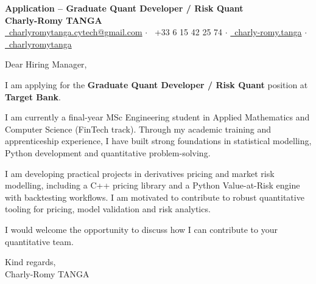 \documentclass[10pt, letterpaper]{article}
\newcommand{\targetCompany}{Target Bank}
\newcommand{\targetRole}{Graduate Quant Developer / Risk Quant}
\begin{document}
\begin{center}
    \textbf{\LARGE Application -- \targetRole{}} \\[0.2cm]
    \textbf{\large Charly-Romy TANGA} \\[0.2cm]
    \href{mailto:charlyromytanga.cytech@gmail.com}{\faEnvelope\ charlyromytanga.cytech@gmail.com}
    \quad$\cdot$\quad
    \faPhone\ +33 6 15 42 25 74
    \quad$\cdot$\quad
    \href{https://www.linkedin.com/in/charly-romy-tanga}{\faLinkedin\ charly-romy.tanga}
    \quad$\cdot$\quad
    \href{https://github.com/charlyromytanga}{\faGithub\ charlyromytanga}
\end{center}

Dear Hiring Manager,

I am applying for the \textbf{\targetRole{}} position at \textbf{\targetCompany{}}.

I am currently a final-year MSc Engineering student in Applied Mathematics and Computer Science (FinTech track). Through my academic training and apprenticeship experience, I have built strong foundations in statistical modelling, Python development and quantitative problem-solving.

I am developing practical projects in derivatives pricing and market risk modelling, including a C++ pricing library and a Python Value-at-Risk engine with backtesting workflows. I am motivated to contribute to robust quantitative tooling for pricing, model validation and risk analytics.

I would welcome the opportunity to discuss how I can contribute to your quantitative team.

Kind regards,\\
Charly-Romy TANGA
\end{document}
